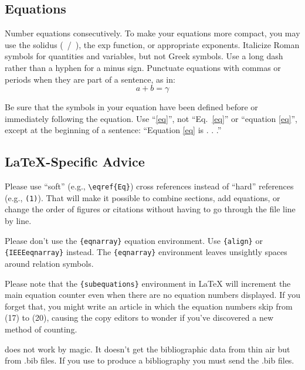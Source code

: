     \subsection{Equations}

        Number equations consecutively.
        To make your equations more compact, you may use the solidus (~/~), the exp function, or appropriate exponents.
        Italicize Roman symbols for quantities and variables, but not Greek symbols.
        Use a long dash rather than a hyphen for a minus sign.
        Punctuate equations with commas or periods when they are part of a sentence, as in:
        \begin{equation}
            a+b=\gamma\label{eq}
        \end{equation}

        Be sure that the symbols in your equation have been defined before or immediately following the equation.
        Use ``\eqref{eq}'', not ``Eq.~\eqref{eq}'' or ``equation \eqref{eq}'', except at the beginning of a sentence: ``Equation \eqref{eq} is . . .''

    \subsection{\LaTeX-Specific Advice}

        Please use ``soft'' (e.g., \verb|\eqref{Eq}|) cross references instead of ``hard'' references (e.g., \verb|(1)|).
        That will make it possible to combine sections, add equations, or change the order of figures or citations without having to go through the file line by line.

        Please don't use the \verb|{eqnarray}| equation environment.
        Use \verb|{align}| or \verb|{IEEEeqnarray}| instead.
        The \verb|{eqnarray}| environment leaves unsightly spaces around relation symbols.

        Please note that the \verb|{subequations}| environment in {\LaTeX} will increment the main equation counter even when there are no equation numbers displayed.
        If you forget that, you might write an article in which the equation numbers skip from (17) to (20), causing the copy editors to wonder if you've discovered a new method of counting.

        {\BibTeX} does not work by magic.
        It doesn't get the bibliographic data from thin air but from .bib files.
        If you use {\BibTeX} to produce a bibliography you must send the .bib files.

